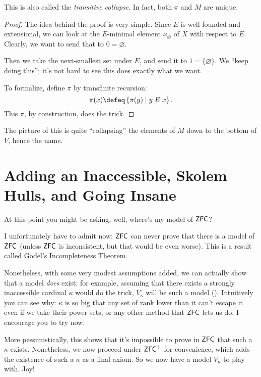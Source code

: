 This is also called the \emph{transitive collapse}.
In fact, both $\pi$ and $M$ are unique.

\begin{proof}
	The idea behind the proof is very simple.
	Since $E$ is well-founded and extensional, we can look at the
	$E$-minimal element $x_\varnothing$ of $X$ with respect to $E$.
	Clearly, we want to send that to $0 = \varnothing$.

	Then we take the next-smallest set under $E$, and send it to $1 = \{\varnothing\}$.
	We ``keep doing this''; it's not hard to see this does exactly what we want.

	To formalize, define $\pi$ by transfinite recursion:
	\[ \pi(x) \defeq \left\{ \pi(y) \mid y \; E \; x \right\}. \]
	This $\pi$, by construction, does the trick.
\end{proof}

The picture of this is quite ``collapsing'' the elements of $M$ down
to the bottom of $V$, hence the name.


\section{Adding an Inaccessible, Skolem Hulls, and Going Insane}
At this point you might be asking, well, where's my model of $\mathsf{ZFC}$?

I unfortunately have to admit now: $\mathsf{ZFC}$ can never prove that there is a model of $\mathsf{ZFC}$
(unless $\mathsf{ZFC}$ is inconsistent, but that would be even worse).
This is a result called G\"odel's Incompleteness Theorem.

Nonetheless, with some very modest assumptions added, we can actually show that a model \emph{does} exist:
for example, assuming that there exists a strongly inaccessible cardinal $\kappa$ would do the trick,
$V_\kappa$ will be such a model ().
Intuitively you can see why: $\kappa$ is so big that any set of rank lower than it can't escape it
even if we take their power sets, or any other method that $\mathsf{ZFC}$ lets us do.
I encourage you to try  now.

More pessimistically, this shows that it's impossible to prove in $\mathsf{ZFC}$ that such a $\kappa$ exists.
Nonetheless, we now proceed under $\mathsf{ZFC}^+$ for convenience, which adds the existence of such a $\kappa$
as a final axiom.
So we now have a model $V_\kappa$ to play with. Joy!

